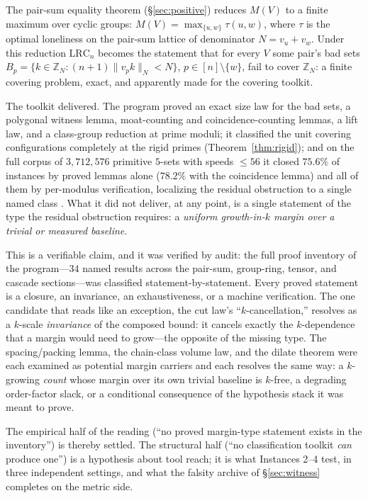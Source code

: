 \documentclass[11pt,a4paper]{article}
\numberwithin{equation}{section}
\theoremstyle{plain}
\theoremstyle{definition}
\theoremstyle{remark}
\newcommand{\Z}{\mathbb{Z}}
\newcommand{\wn}[1]{\lVert #1 \rVert_{N}}
\newcommand{\lrc}{\mathrm{LRC}}
\begin{document}
The pair-sum equality theorem (\S\ref{sec:positive}) reduces
$M(V)$ to a finite maximum over cyclic groups: $M(V)=\max_{\{u,w\}}
\tau(u,w)$, where $\tau$ is the optimal loneliness on the pair-sum
lattice of denominator $N=v_u+v_w$. Under this reduction $\lrc_n$
becomes the statement that for every $V$ some pair's bad sets
$B_p=\{k\in\Z_N:(n{+}1)\wn{v_pk}<N\}$, $p\in[n]\setminus\{w\}$, fail to
cover $\Z_N$: a finite covering problem, exact, and apparently made for
the covering toolkit.

The toolkit delivered. The program proved an exact size law for the bad
sets, a polygonal witness lemma, moat-counting and coincidence-counting
lemmas, a lift law, and a class-group reduction at prime moduli; it
classified the unit covering configurations completely at the rigid
primes (Theorem~\ref{thm:rigid}); and on the full corpus of
$3{,}712{,}576$ primitive $5$-sets with speeds $\le 56$ it closed
$75.6\%$ of instances by proved lemmas alone ($78.2\%$ with the
coincidence lemma) and all of them by per-modulus verification,
localizing the residual obstruction to a single named class
\cite{prog-artifacts}. What it did not deliver, at any point, is a
single statement of the type the residual obstruction requires: a
\emph{uniform growth-in-$k$ margin over a trivial or measured
baseline}.

This is a verifiable claim, and it was verified by audit: the full proof
inventory of the program---$34$ named results across the pair-sum,
group-ring, tensor, and cascade sections---was classified
statement-by-statement. Every proved statement is a closure, an
invariance, an exhaustiveness, or a machine verification. The one
candidate that reads like an exception, the cut law's
``$k$-cancellation,'' resolves as a $k$-scale \emph{invariance} of the
composed bound: it cancels exactly the $k$-dependence that a margin
would need to grow---the opposite of the missing type. The
spacing/packing lemma, the chain-class volume law, and the dilate theorem
were each examined as potential margin carriers and each resolves the
same way: a $k$-growing \emph{count} whose margin over its own trivial
baseline is $k$-free, a degrading order-factor slack, or a conditional
consequence of the hypothesis stack it was meant to prove.

The empirical half of the reading (``no proved margin-type statement
exists in the inventory'') is thereby settled. The structural half (``no
classification toolkit \emph{can} produce one'') is a hypothesis about
tool reach; it is what Instances 2--4 test, in three independent
settings, and what the falsity archive of \S\ref{sec:witness} completes
on the metric side.
\end{document}
